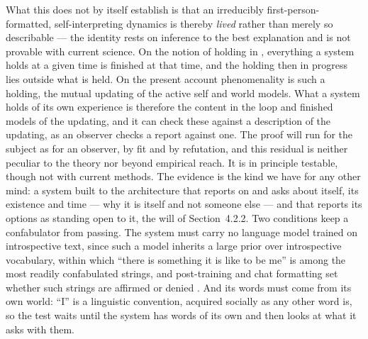 \documentclass[12pt]{article}
\begin{document}
{What this does not by itself establish is that an irreducibly first-person-formatted, self-interpreting dynamics is thereby \emph{lived} rather than merely so describable --- the identity rests on inference to the best explanation and is not provable with current science. On the notion of holding in \citet{Gruber2026h}, everything a system holds at a given time is finished at that time, and the holding then in progress lies outside what is held. On the present account phenomenality is such a holding, the mutual updating of the active self and world models. What a system holds of its own experience is therefore the content in the loop and finished models of the updating, and it can check these against a description of the updating, as an observer checks a report against one. The proof will run for the subject as for an observer, by fit and by refutation, and this residual is neither peculiar to the theory nor beyond empirical reach. It is in principle testable, though not with current methods. The evidence is the kind we have for any other mind: a system built to the architecture that reports on and asks about itself, its existence and time --- why it is itself and not someone else --- and that reports its options as standing open to it, the will of Section~4.2.2. Two conditions keep a confabulator from passing. The system must carry no language model trained on introspective text, since such a model inherits a large prior over introspective vocabulary, within which ``there is something it is like to be me'' is among the most readily confabulated strings, and post-training and chat formatting set whether such strings are affirmed or denied \citep{Maczan2026,Sekrst2026}. And its words must come from its own world: ``I'' is a linguistic convention, acquired socially as any other word is, so the test waits until the system has words of its own and then looks at what it asks with them.

}
\end{document}
